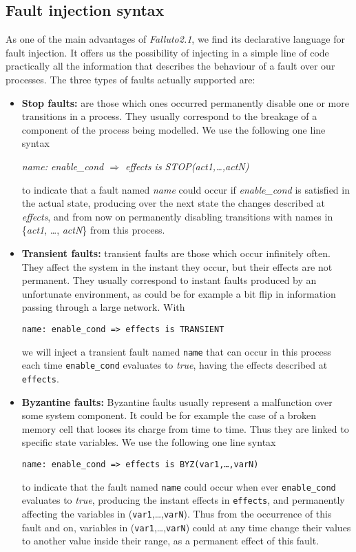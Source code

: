 \documentclass[12pt]{article}
\newcommand{\falluto}{\mbox{\textit{Falluto2.1}}}
\begin{document}
\subsection{Fault injection syntax}
As one of the main advantages of \falluto, we find its declarative language for fault injection. It offers us the possibility of injecting in a simple line of code practically all the information that describes the behaviour of a fault over our processes. The three types of faults actually supported are:
\begin{itemize}

\item \textbf{Stop faults:} are those which ones occurred permanently disable one or more transitions in a process. They usually correspond to the breakage of a component of the process being modelled. We use the following one line syntax
\begin{center}
\textit{name: enable\_cond $\Rightarrow$ effects is STOP(act1,\ldots,actN)}
\end{center}
to indicate that a fault named \textit{name} could occur if \textit{enable\_cond} is satisfied in the actual state, producing over the next state the changes described at \textit{effects}, and from now on permanently disabling transitions with names in \{\textit{act1}, \ldots, \textit{actN}\} from this process.

\item \textbf{Transient faults:} transient faults are those which occur infinitely often. They affect the system in the instant they occur, but their effects are not permanent. They usually correspond to instant faults produced by an unfortunate environment, as could be for example a bit flip in information passing through a large network. With
\begin{center}
\texttt{name: enable\_cond => effects is TRANSIENT}
\end{center}
we will inject a transient fault named \texttt{name} that can occur in this process each time \texttt{enable\_cond} evaluates to \textit{true}, having the effects described at \texttt{effects}.

\item \textbf{Byzantine faults:} Byzantine faults usually represent a malfunction over some system component. It could be for example the case of a broken memory cell that looses its charge from time to time. Thus they are linked to specific state variables. We use the following one line syntax
\begin{center}
\texttt{name: enable\_cond => effects is BYZ(var1,\ldots,varN)}
\end{center}
to indicate that the fault named \texttt{name} could occur when ever \texttt{enable\_cond} evaluates to \textit{true}, producing the instant effects in \texttt{effects}, and permanently affecting the variables in (\texttt{var1},\ldots,\texttt{varN}). Thus from the occurrence of this fault and on, variables in (\texttt{var1},\ldots,\texttt{varN}) could at any time change their values to another value inside their range, as a permanent effect of this fault.
\end{itemize}
\end{document}
